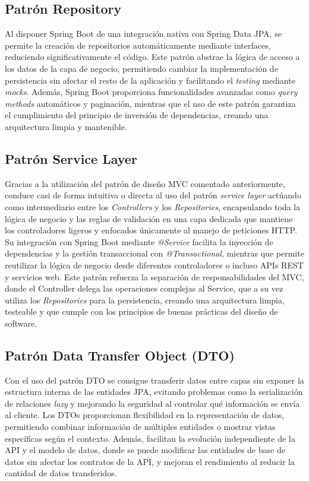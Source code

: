 \subsection{Patrón Repository}\label{patron-repository}
Al disponer Spring Boot de una integración nativa con Spring Data JPA, se permite la creación de repositorios automáticamente mediante interfaces, reduciendo significativamente el código. Este patrón abstrae la lógica de acceso a los datos de la capa de negocio, permitiendo cambiar la implementación de persistencia sin afectar el resto de la aplicación y facilitando el \emph{testing} mediante \emph{mocks}. Además, Spring Boot proporciona funcionalidades avanzadas como \emph{query methods} automáticos y paginación, mientras que el uso de este patrón garantiza el cumplimiento del principio de inversión de dependencias, creando una arquitectura limpia y mantenible.

\subsection{Patrón Service Layer}\label{patron-service-layer}
Gracias a la utilización del patrón de diseño MVC comentado anteriormente, conduce casi de forma intuitiva o directa al uso del patrón \emph{service layer} actúando como intermediario entre los \emph{Controllers} y los \emph{Repositories}, encapsulando toda la lógica de negocio y las reglas de validación en una capa dedicada que mantiene los controladores ligeros y enfocados únicamente al manejo de peticiones HTTP. Su integración con Spring Boot mediante \emph{@Service} facilita la inyección de dependencias y la gestión transaccional con \emph{@Transactional}, mientras que permite reutilizar la lógica de negocio desde diferentes controladores o incluso APIs REST y servicios web. Este patrón refuerza la separación de responsabilidades del MVC, donde el Controller delega las operaciones complejas al Service, que a su vez utiliza los \emph{Repositories} para la persistencia, creando una arquitectura limpia, testeable y que cumple con los principios de buenas prácticas del diseño de software.

\subsection{Patrón Data Transfer Object (DTO)}\label{patron-data-transfer-object}
Con el uso del patrón DTO se consigue transferir datos entre capas sin exponer la estructura interna de las entidades JPA, evitando problemas como la serialización de relaciones \emph{lazy} y mejorando la seguridad al controlar qué información se envía al cliente. Los DTOs proporcionan flexibilidad en la representación de datos, permitiendo combinar información de múltiples entidades o mostrar vistas específicas según el contexto. Además, facilitan la evolución independiente de la API y el modelo de datos, donde se puede modificar las entidades de base de datos sin afectar los contratos de la API, y mejoran el rendimiento al reducir la cantidad de datos transferidos.

